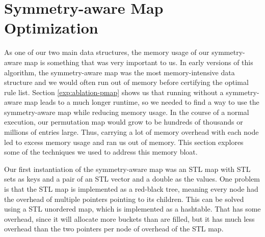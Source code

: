 \section{Symmetry-aware Map Optimization}
\label{exp:pmap}
As one of our two main data structures, the memory usage of our symmetry-aware map is something that was very important to us.
In early versions of this algorithm, the symmetry-aware map was the most memory-intensive data structure and we would often run out of memory before certifying the optimal rule list.
Section \ref{exp:ablation-pmap} shows us that running without a symmetry-aware map leads to a much longer runtime, so we needed to find a way to use the symmetry-aware map while reducing memory usage. 
In the course of a normal execution, our permutation map would grow to be hundreds of thousands or millions of entries large.
Thus, carrying a lot of memory overhead with each node led to excess memory usage and ran us out of memory.
This section explores some of the techniques we used to address this memory bloat.

Our first instantiation of the symmetry-aware map was an STL map with STL sets as keys and a pair of an STL vector and a double as the values.
One problem is that the STL map is implemented as a red-black tree, meaning every node had the overhead of multiple pointers pointing to its children.
This can be solved using a STL unordered map, which is implemented as a hashtable.
That has some overhead, since it will allocate more buckets than are filled, but it has much less overhead than the two pointers per node of overhead of the STL map.

